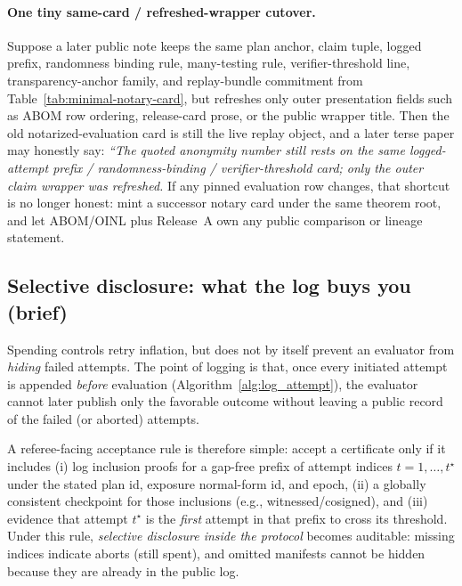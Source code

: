 \documentclass[11pt]{article}
\begin{document}
\paragraph{One tiny same-card / refreshed-wrapper cutover.}
Suppose a later public note keeps the same plan anchor, claim tuple, logged prefix, randomness binding rule, many-testing rule, verifier-threshold line, transparency-anchor family, and replay-bundle commitment from Table~\ref{tab:minimal-notary-card}, but refreshes only outer presentation fields such as ABOM row ordering, release-card prose, or the public wrapper title.
Then the old notarized-evaluation card is still the live replay object, and a later terse paper may honestly say: \emph{``The quoted anonymity number still rests on the same logged-attempt prefix / randomness-binding / verifier-threshold card; only the outer claim wrapper was refreshed.}
If any pinned evaluation row changes, that shortcut is no longer honest: mint a successor notary card under the same theorem root, and let ABOM/OINL plus Release~A own any public comparison or lineage statement.\cite{series:abomoinl,series:releaseproperty}

\subsection{Selective disclosure: what the log buys you (brief)}
Spending controls retry inflation, but does not by itself prevent an evaluator from \emph{hiding} failed attempts.
The point of logging is that, once every initiated attempt is appended \emph{before} evaluation (Algorithm~\ref{alg:log_attempt}),
the evaluator cannot later publish only the favorable outcome without leaving a public record of the failed (or aborted) attempts.

A referee-facing acceptance rule is therefore simple:
accept a certificate only if it includes (i) log inclusion proofs for a gap-free prefix of attempt indices $t=1,\dots,t^\star$ under the stated plan id, exposure normal-form id, and epoch,
(ii) a globally consistent checkpoint for those inclusions (e.g., witnessed/cosigned), and
(iii) evidence that attempt $t^\star$ is the \emph{first} attempt in that prefix to cross its threshold.
Under this rule, \emph{selective disclosure inside the protocol} becomes auditable: missing indices indicate aborts (still spent), and omitted manifests cannot be hidden because they are already in the public log.
\end{document}
